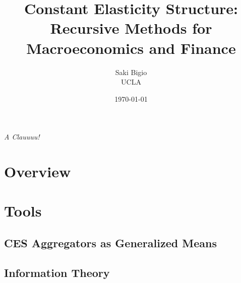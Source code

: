 \documentclass[12pt,openany]{book}
\title{Constant Elasticity Structure: \\ Recursive Methods for Macroeconomics and Finance}
\author{Saki Bigio \\UCLA}
\date{\today}
\begin{document}
\frontmatter
\maketitle

\newpage
\thispagestyle{empty}
\vspace{1em}
\textit{A Clauuuu!}\\[0.5em]
\vspace{1em}

\newpage



\newpage



\tableofcontents

\mainmatter



\newpage
% 

\part*{Overview}




\part{Tools}
\label{part:tools}

\chapter{CES Aggregators as Generalized Means}
\label{ch:ces-aggregators}



\chapter{Information Theory}
\label{ch:information}
\end{document}
